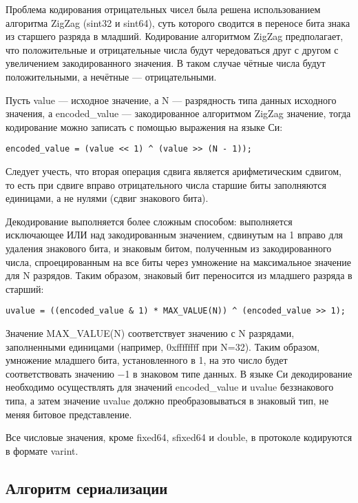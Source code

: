 Проблема кодирования отрицательных чисел была решена использованием алгоритма ZigZag (sint32 и sint64), суть которого сводится в переносе бита знака из старшего разряда в младший. Кодирование алгоритмом ZigZag предполагает, что положительные и отрицательные числа будут чередоваться друг с другом с увеличением закодированного значения. В таком случае чётные числа будут положительными, а нечётные --- отрицательными.

Пусть value --- исходное значение, а N --- разрядность типа данных исходного значения, а encoded\_value --- закодированное алгоритмом ZigZag значение, тогда кодирование можно записать с помощью выражения на языке Си:

\begin{lstlisting}
encoded_value = (value << 1) ^ (value >> (N - 1));
\end{lstlisting}

Следует учесть, что вторая операция сдвига является арифметическим сдвигом, то есть при сдвиге вправо отрицательного числа старшие биты заполняются единицами, а не нулями (сдвиг знакового бита).

Декодирование выполняется более сложным способом: выполняется исключающее ИЛИ над закодированным значением, сдвинутым на 1 вправо для удаления знакового бита, и знаковым битом, полученным из закодированного числа, спроецированным на все биты через умножение на максимальное значение для N разрядов. Таким образом, знаковый бит переносится из младшего разряда в старший:

\begin{lstlisting}
uvalue = ((encoded_value & 1) * MAX_VALUE(N)) ^ (encoded_value >> 1);
\end{lstlisting}

Значение MAX\_VALUE(N) соответствует значению с N разрядами, заполненными единицами (например, 0xffffffff при N=32). Таким образом, умножение младшего бита, установленного в 1, на это число будет соответствовать значению −1 в знаковом типе данных. В языке Си декодирование необходимо осуществлять для значений encoded\_value и uvalue беззнакового типа, а затем значение uvalue должно преобразовываться в знаковый тип, не меняя битовое представление.

Все числовые значения, кроме fixed64, sfixed64 и double, в протоколе кодируются в формате varint.

\subsection{Алгоритм сериализации}

